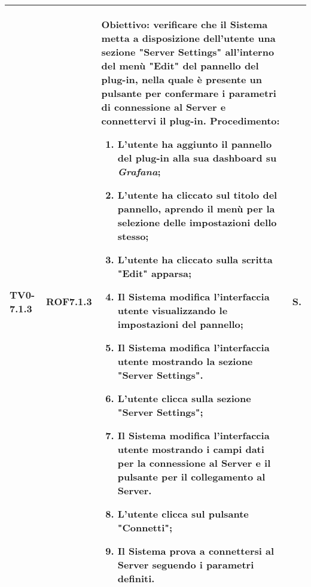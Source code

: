 \begin{longtable}{|C{.15\textwidth}|C{.13\textwidth}|m{.65\textwidth}|C{.08\textwidth}|}
TV0-7.1.3 & ROF7.1.3 &
	\textbf{Obiettivo}: verificare che il Sistema metta a disposizione dell'utente una sezione "Server Settings" all'interno del menù "Edit" del pannello del plug-in, nella quale è presente un pulsante per confermare i parametri di connessione al Server e connettervi il plug-in. \newline
	\textbf{Procedimento}:
	\begin{enumerate}
		\item L'utente ha aggiunto il pannello del plug-in alla sua dashboard su \textit{Grafana};
		\item L'utente ha cliccato sul titolo del pannello, aprendo il menù per la selezione delle impostazioni dello stesso;
		\item L'utente ha cliccato sulla scritta "Edit" apparsa;
		\item Il Sistema modifica l'interfaccia utente visualizzando le impostazioni del pannello;
		\item Il Sistema modifica l'interfaccia utente mostrando la sezione "Server Settings".
		\item L'utente clicca sulla sezione "Server Settings";
		\item Il Sistema modifica l'interfaccia utente mostrando i campi dati per la connessione al Server e il pulsante per il collegamento al Server.
		\item L'utente clicca sul pulsante "Connetti";
		\item Il Sistema prova a connettersi al Server seguendo i parametri definiti.
	\end{enumerate}
	& S. \\
\hline


\end{longtable}
